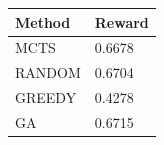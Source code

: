 \begin{tabular}{ll}
\hline
Method & Reward \\
\hline
  MCTS & 0.6678 \\
  RANDOM & 0.6704 \\
  GREEDY & 0.4278 \\
  GA & 0.6715 \\
\hline
\end{tabular}
